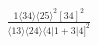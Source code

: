 \documentclass[varwidth, border=5pt]{standalone}
\begin{document}
\begin{my}
$\begin{gathered}
\scriptscriptstyle\frac{1⟨34⟩⟨25⟩^2[34]^2}{⟨13⟩⟨24⟩⟨4|1+3|4]^2}
\end{gathered}$
\end{my}
\end{document}
